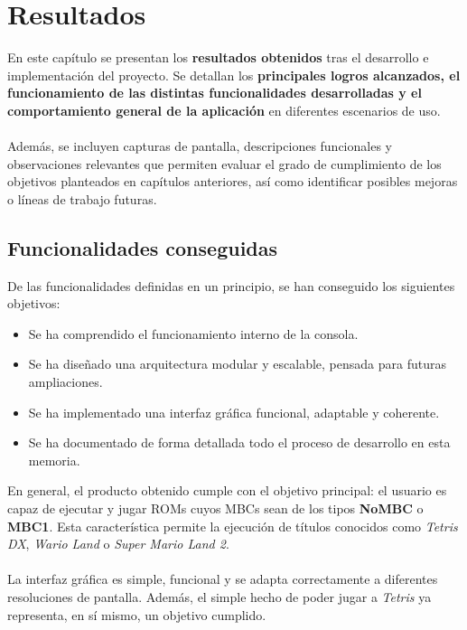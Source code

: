 \chapter{Resultados}
\label{results}

En este capítulo se presentan los \textbf{resultados obtenidos} tras el desarrollo e implementación del proyecto. Se detallan los \textbf{principales logros alcanzados, el funcionamiento de las distintas funcionalidades desarrolladas y el comportamiento general de la aplicación} en diferentes escenarios de uso.
\\\\
Además, se incluyen capturas de pantalla, descripciones funcionales y observaciones relevantes que permiten evaluar el grado de cumplimiento de los objetivos planteados en capítulos anteriores, así como identificar posibles mejoras o líneas de trabajo futuras.

\section{Funcionalidades conseguidas}

De las funcionalidades definidas en un principio, se han conseguido los siguientes objetivos:

\begin{itemize}
    \item Se ha comprendido el funcionamiento interno de la consola.
    \item Se ha diseñado una arquitectura modular y escalable, pensada para futuras ampliaciones.
    \item Se ha implementado una interfaz gráfica funcional, adaptable y coherente.
    \item Se ha documentado de forma detallada todo el proceso de desarrollo en esta memoria.
\end{itemize}

En general, el producto obtenido cumple con el objetivo principal: el usuario es capaz de ejecutar y jugar ROMs cuyos MBCs sean de los tipos \textbf{NoMBC} o \textbf{MBC1}. Esta característica permite la ejecución de títulos conocidos como \textit{Tetris DX}, \textit{Wario Land} o \textit{Super Mario Land 2}.
\\\\
La interfaz gráfica es simple, funcional y se adapta correctamente a diferentes resoluciones de pantalla. Además, el simple hecho de poder jugar a \textit{Tetris} ya representa, en sí mismo, un objetivo cumplido.

